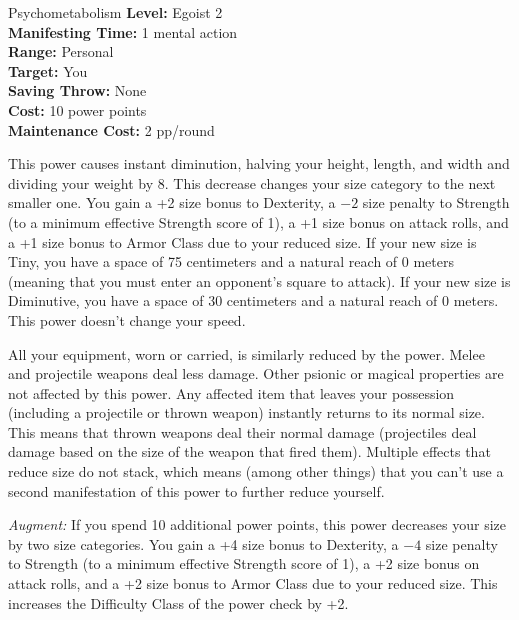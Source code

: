{Psychometabolism}
{
	\textbf{Level:}
	Egoist 2\\
	\textbf{Manifesting Time:}
	1 mental action\\
	\textbf{Range:}
	Personal\\
	\textbf{Target:}
	You\\
	\textbf{Saving Throw:}
	None\\
	\textbf{Cost:}
	10 power points\\
	\textbf{Maintenance Cost:}
	2 pp/round\\
}
{
	This power causes instant diminution, halving your height, length, and width and dividing your weight by 8. This decrease changes your size category to the next smaller one. You gain a +2 size bonus to Dexterity, a $-2$ size penalty to Strength (to a minimum effective Strength score of 1), a +1 size bonus on attack rolls, and a +1 size bonus to Armor Class due to your reduced size. If your new size is Tiny, you have a space of 75 centimeters and a natural reach of 0 meters (meaning that you must enter an opponent's square to attack). If your new size is Diminutive, you have a space of 30 centimeters and a natural reach of 0 meters. This power doesn't change your speed.

	All your equipment, worn or carried, is similarly reduced by the power. Melee and projectile weapons deal less damage. Other psionic or magical properties are not affected by this power. Any affected item that leaves your possession (including a projectile or thrown weapon) instantly returns to its normal size. This means that thrown weapons deal their normal damage (projectiles deal damage based on the size of the weapon that fired them). Multiple effects that reduce size do not stack, which means (among other things) that you can't use a second manifestation of this power to further reduce yourself.

	\textit{Augment:} If you spend 10 additional power points,  this power decreases your size by two size categories. You gain a +4 size bonus to Dexterity, a $-4$ size penalty to Strength (to a minimum effective Strength score of 1), a +2 size bonus on attack rolls, and a +2 size bonus to Armor Class due to your reduced size. This increases the Difficulty Class of the power check by +2.
}